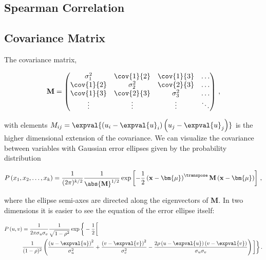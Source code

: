 \subsection{Spearman Correlation}
\label{stats:corr_covar:spearman}


\subsection{Covariance Matrix}
\label{stats:corr_covar:covar_matrix}

The covariance matrix,

\begin{align}
  \mathbf{M} = \begin{pmatrix}
    \sigma_1^2   & \cov{1}{2} & \cov{1}{3} & \ldots \\
    \cov{1}{2}   & \sigma_2^2 & \cov{2}{3} & \ldots \\
    \cov{1}{3}   & \cov{2}{3} & \sigma_3^2 & \ldots \\
    \vdots       & \vdots     & \vdots     & \ddots
  \end{pmatrix}\,,
\end{align}

\noindent with elements $M_{ij} = \expval{\left(u_{i} - \expval{u}_{i}\right)\left(u_{j}-\expval{u}_{j}\right)}$
is the higher dimensional extension of the covariance.
We can visualize the covariance between variables with
Gaussian error ellipses given by the probability distribution

\begin{equation}\label{eq:stats:P_error_ellipse_k}
P\left(x_{1},x_{2},\ldots,x_{k}\right) = \frac{1}{(2\pi)^{k/2}}\frac{1}{\abs{\mathbf{M}}^{1/2}}\exp\left[-\frac{1}{2}\left(\mathbf{x}-\bm{\mu}\right)^{\transpose}\mathbf{M}\left(\mathbf{x}-\bm{\mu}\right)\right]\,,
\end{equation}

\noindent where the ellipse semi-axes are directed along the eigenvectors of $\mathbf{M}$.
In two dimensions it is easier to see the equation of the error ellipse itself:

\begin{equation}\label{eq:stats:P_error_ellipse_2}
\begin{split}
P\left(u,v\right) &= \frac{1}{2\pi\sigma_{u}\sigma_{v}}\frac{1}{\sqrt{1-\rho^{2}}}\exp\bigg\{-\frac{1}{2}\bigg[ \\
&\frac{1}{(1-\rho)^{2}}\left(\frac{\left(u-\expval{u}\right)^{2}}{\sigma_{u}^{2}}+\frac{\left(v-\expval{v}\right)^{2}}{\sigma_{v}^{2}}-\frac{2\rho \left(u-\expval{u}\right)\left(v-\expval{v}\right)}{\sigma_{u}\sigma_{v}}\right)\bigg]\bigg\}\,.
\end{split}
\end{equation}


